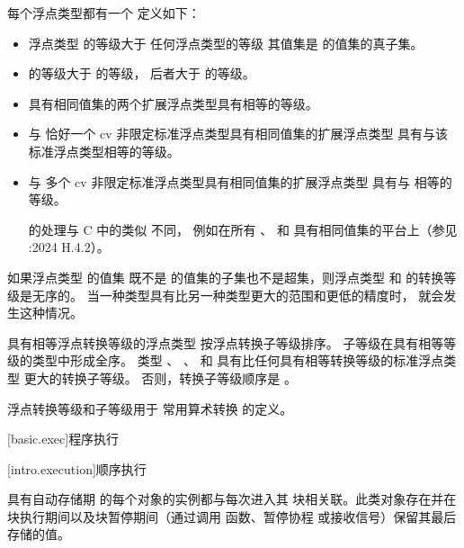 \pnum
每个浮点类型都有一个 
定义如下：
\begin{itemize}
\item
浮点类型  的等级大于
任何浮点类型的等级
其值集是  的值集的真子集。
\item
{} 的等级大于
 的等级，
后者大于  的等级。
\item
具有相同值集的两个扩展浮点类型具有相等的等级。
\item
与
恰好一个 cv 非限定标准浮点类型具有相同值集的扩展浮点类型
具有与该标准浮点类型相等的等级。
\item
与
多个 cv 非限定标准浮点类型具有相同值集的扩展浮点类型
具有与  相等的等级。
\begin{tailnote}
 的处理与
C 中的类似  不同，
例如在所有
、
 和
具有相同值集的平台上（参见 \IsoCUndated{}:2024 H.4.2）。
\end{tailnote}
\end{itemize}
\begin{note}
如果浮点类型  的值集
既不是  的值集的子集也不是超集，则浮点类型  和 
的转换等级是无序的。
当一种类型具有比另一种类型更大的范围和更低的精度时，
就会发生这种情况。
\end{note}

\pnum
具有相等浮点转换等级的浮点类型
按浮点转换子等级排序。
子等级在具有相等等级的类型中形成全序。
类型
、
、
 和
具有比任何具有相等转换等级的标准浮点类型
更大的转换子等级。
否则，转换子等级顺序是
。

\pnum
\begin{note}
浮点转换等级和子等级用于
常用算术转换 的定义。
\end{note}

[basic.exec]{程序执行}

[intro.execution]{顺序执行}

\pnum
具有自动存储期 的每个对象的实例都与每次进入其
块相关联。此类对象存在并在块执行期间以及块暂停期间（通过调用
函数、暂停协程 或接收信号）保留其最后存储的值。

